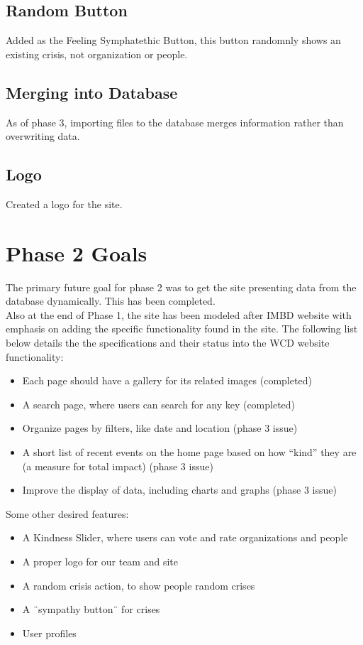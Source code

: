 \documentclass[12pt]{report}
\begin{document}
\subsection*{Random Button}
\hfill

Added as the Feeling Symphatethic Button, this button randomnly shows an existing crisis, not organization or people.


\subsection*{Merging into Database}
\hfill

As of phase 3, importing files to the database merges information rather than overwriting data.  

\subsection*{Logo}
\hfill

Created a logo for the site.

\newpage
\section*{Phase 2 Goals}
\hfill


The primary future goal for phase 2 was to get the site presenting data from the database dynamically. This has been completed.\\


Also at the end of Phase 1, the site has been modeled after IMBD website with emphasis on adding the specific functionality found in the site. The following list below details the the specifications and their status into the WCD website functionality:
\begin{itemize}
\item Each page should have a gallery for its related images (completed)
\item A search page, where users can search for any key (completed)
\item Organize pages by filters, like date and location (phase 3 issue)
\item A short list of recent events on the home page based on how ``kind'' they are (a measure for total impact) (phase 3 issue)
\item Improve the display of data, including charts and graphs (phase 3 issue)
\end{itemize}

\hfill \newline
Some other desired features:
\begin{itemize}
\item A Kindness Slider, where users can vote and rate organizations and people
\item A proper logo for our team and site
\item A random crisis action, to show people random crises
\item A ¨sympathy button¨ for crises
\item User profiles
\end{itemize}
\end{document}

